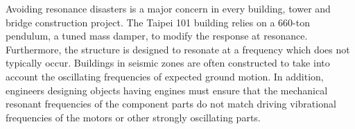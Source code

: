 Avoiding resonance disasters is a major concern in every building, tower and bridge construction project. The Taipei 101 building relies on a 660-ton pendulum, a tuned mass damper, to modify the response at resonance. Furthermore, the structure is designed to resonate at a frequency which does not typically occur. Buildings in seismic zones are often constructed to take into account the oscillating frequencies of expected ground motion. In addition, engineers designing objects having engines must ensure that the mechanical resonant frequencies of the component parts do not match driving vibrational frequencies of the motors or other strongly oscillating parts.



 

